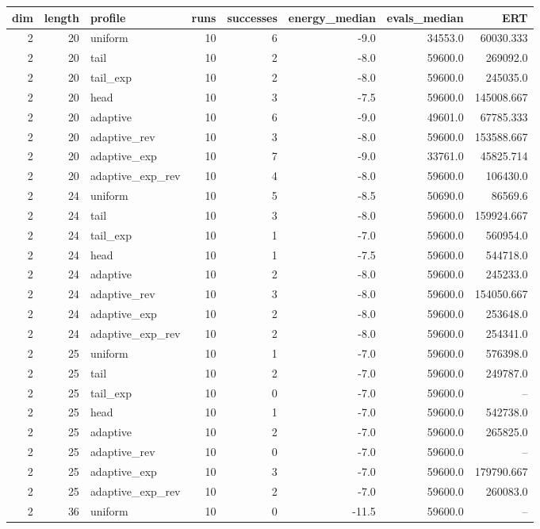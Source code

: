 \begin{tabular}{rrlrrrrr}
\hline
dim & length & profile & runs & successes & energy\_median & evals\_median & ERT \\
\hline
2 & 20 & uniform & 10 & 6 & -9.0 & 34553.0 & 60030.333 \\
2 & 20 & tail & 10 & 2 & -8.0 & 59600.0 & 269092.0 \\
2 & 20 & tail\_exp & 10 & 2 & -8.0 & 59600.0 & 245035.0 \\
2 & 20 & head & 10 & 3 & -7.5 & 59600.0 & 145008.667 \\
2 & 20 & adaptive & 10 & 6 & -9.0 & 49601.0 & 67785.333 \\
2 & 20 & adaptive\_rev & 10 & 3 & -8.0 & 59600.0 & 153588.667 \\
2 & 20 & adaptive\_exp & 10 & 7 & -9.0 & 33761.0 & 45825.714 \\
2 & 20 & adaptive\_exp\_rev & 10 & 4 & -8.0 & 59600.0 & 106430.0 \\
2 & 24 & uniform & 10 & 5 & -8.5 & 50690.0 & 86569.6 \\
2 & 24 & tail & 10 & 3 & -8.0 & 59600.0 & 159924.667 \\
2 & 24 & tail\_exp & 10 & 1 & -7.0 & 59600.0 & 560954.0 \\
2 & 24 & head & 10 & 1 & -7.5 & 59600.0 & 544718.0 \\
2 & 24 & adaptive & 10 & 2 & -8.0 & 59600.0 & 245233.0 \\
2 & 24 & adaptive\_rev & 10 & 3 & -8.0 & 59600.0 & 154050.667 \\
2 & 24 & adaptive\_exp & 10 & 2 & -8.0 & 59600.0 & 253648.0 \\
2 & 24 & adaptive\_exp\_rev & 10 & 2 & -8.0 & 59600.0 & 254341.0 \\
2 & 25 & uniform & 10 & 1 & -7.0 & 59600.0 & 576398.0 \\
2 & 25 & tail & 10 & 2 & -7.0 & 59600.0 & 249787.0 \\
2 & 25 & tail\_exp & 10 & 0 & -7.0 & 59600.0 & -- \\
2 & 25 & head & 10 & 1 & -7.0 & 59600.0 & 542738.0 \\
2 & 25 & adaptive & 10 & 2 & -7.0 & 59600.0 & 265825.0 \\
2 & 25 & adaptive\_rev & 10 & 0 & -7.0 & 59600.0 & -- \\
2 & 25 & adaptive\_exp & 10 & 3 & -7.0 & 59600.0 & 179790.667 \\
2 & 25 & adaptive\_exp\_rev & 10 & 2 & -7.0 & 59600.0 & 260083.0 \\
2 & 36 & uniform & 10 & 0 & -11.5 & 59600.0 & -- \\

\end{tabular}
